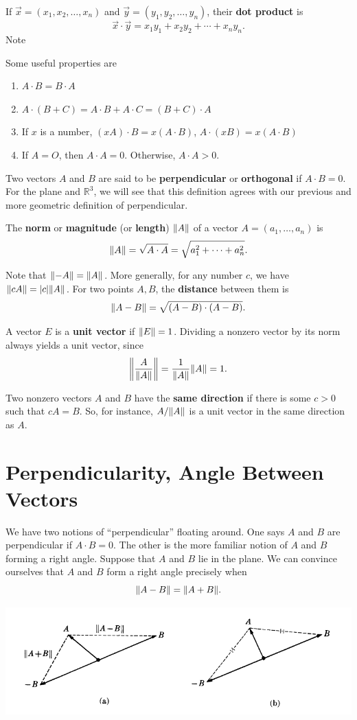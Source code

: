 \documentclass{article}
\begin{document}
If $\vec{x} = (x_1,x_2, \ldots, x_n)$ and $\vec{y} = (y_1, y_2, \ldots, y_n)$,
their \textbf{dot product} is 
\[\vec{x} \cdot \vec{y} = x_1 y_1 + x_2 y_2 + \cdots + x_n y_n.\]
Note 

Some useful properties are

\begin{enumerate}
    \item $A \cdot B = B \cdot A$
    \item $A \cdot (B + C) = A \cdot B + A \cdot C = (B+C) \cdot A$
    \item If $x$ is a number, $(xA) \cdot B = x(A \cdot B)$, $A \cdot (xB) = x(A \cdot B)$
    \item If $A=O$, then $A \cdot A = 0$. Otherwise, $A \cdot A > 0$.
\end{enumerate}

Two vectors $A$ and $B$ are said to be \textbf{perpendicular} or \textbf{orthogonal} if
$A \cdot B = 0$. For the plane and $\mathbb{R}^3$, we will see that this
definition agrees with our previous and more geometric definition of perpendicular.

The \textbf{norm} or \textbf{magnitude} (or \textbf{length}) $\norm{A}$ of a vector $A=(a_1, \ldots, a_n)$ is 
\[\norm{A} = \sqrt{A \cdot A} = \sqrt{a_1^2 + \cdots + a_n^2}.\]

Note that $\norm{-A} = \norm{A}$. More generally, for any number $c$, 
we have $\norm{cA} = |c|\norm{A}$. For two points $A,B$, the \textbf{distance}
between them is 
\[\norm{A-B}= \sqrt{(A-B)\cdot(A-B)}.\]

A vector $E$ is a \textbf{unit vector} if $\norm{E}=1$. Dividing a nonzero vector by its norm always yields
a unit vector, since 
\[\norm{\frac{A}{\norm{A}}} = \frac{1}{\norm{A}} \norm{A} = 1.\]

Two nonzero vectors $A$ and $B$ have the \textbf{same direction} if there is some $c>0$ such that
$cA = B$. So, for instance, $A/\norm{A}$ is a unit vector in the same direction as $A$.

\section*{Perpendicularity, Angle Between Vectors}

We have two notions of ``perpendicular'' floating around. One says $A$ and $B$ are perpendicular if $A \cdot B = 0$.
The other is the more familiar notion of $A$ and $B$ forming a right angle. Suppose that $A$ and $B$ lie in the plane.
We can convince ourselves that $A$ and $B$ form a right angle precisely when
\[\norm{A-B} = \norm{A+B}.\]

\includegraphics[scale = 0.5]{perpendicular.PNG}
\end{document}
